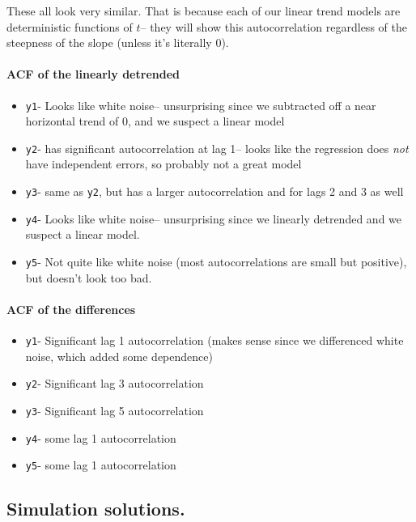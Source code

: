 \documentclass[
  letterpaper,
  DIV=11,
  numbers=noendperiod]{scrartcl}
\let\oldparagraph\paragraph
\renewcommand{\paragraph}[1]{\oldparagraph{#1}\mbox{}}
\providecommand{\tightlist}{%
  \setlength{\itemsep}{0pt}\setlength{\parskip}{0pt}}\usepackage{longtable,booktabs,array}
\begin{document}
These all look very similar. That is because each of our linear trend
models are deterministic functions of \(t\)-- they will show this
autocorrelation regardless of the steepness of the slope (unless it's
literally 0).

\paragraph{ACF of the linearly
detrended}\label{acf-of-the-linearly-detrended}

\begin{itemize}
\tightlist
\item
  \texttt{y1}- Looks like white noise-- unsurprising since we subtracted
  off a near horizontal trend of 0, and we suspect a linear model
\item
  \texttt{y2}- has significant autocorrelation at lag 1-- looks like the
  regression does \emph{not} have independent errors, so probably not a
  great model
\item
  \texttt{y3}- same as \texttt{y2}, but has a larger autocorrelation and
  for lags 2 and 3 as well
\item
  \texttt{y4}- Looks like white noise-- unsurprising since we linearly
  detrended and we suspect a linear model.
\item
  \texttt{y5}- Not quite like white noise (most autocorrelations are
  small but positive), but doesn't look too bad.
\end{itemize}

\paragraph{ACF of the differences}\label{acf-of-the-differences}

\begin{itemize}
\tightlist
\item
  \texttt{y1}- Significant lag 1 autocorrelation (makes sense since we
  differenced white noise, which added some dependence)
\item
  \texttt{y2}- Significant lag 3 autocorrelation
\item
  \texttt{y3}- Significant lag 5 autocorrelation
\item
  \texttt{y4}- some lag 1 autocorrelation
\item
  \texttt{y5}- some lag 1 autocorrelation
\end{itemize}

\subsection{Simulation solutions.}\label{simulation-solutions.}
\end{document}
